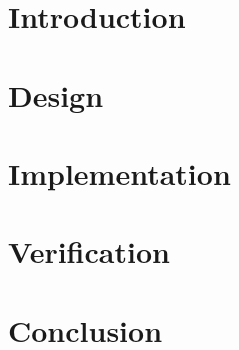\documentclass[titlepage,12pt,a4paper]{article}
\begin{document}


\newpage
\tableofcontents
\newpage
\listoffigures
\listoftables

\newpage
{}

\section{Introduction}

\newpage
\section{Design}

\newpage
\section{Implementation}

\newpage
\section{Verification}

\newpage
\section{Conclusion}

\newpage

\appendix


\end{document}
